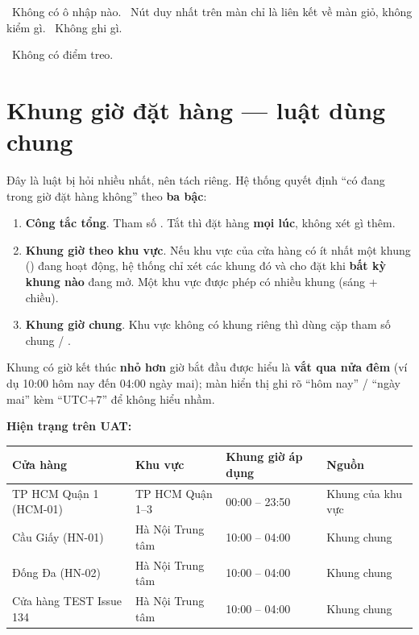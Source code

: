 \mloc\ Không có ô nhập nào. \quad
{}\ Nút duy nhất trên màn chỉ là liên kết về màn giỏ, không kiểm gì.
\quad \mghi\ Không ghi gì.

\mhoi\ Không có điểm treo.

\section{Khung giờ đặt hàng --- luật dùng chung}
\label{sec:khung-gio}

Đây là luật bị hỏi nhiều nhất, nên tách riêng. Hệ thống quyết định ``có đang trong giờ đặt hàng
không'' theo \textbf{ba bậc}:

\begin{enumerate}[leftmargin=*]
  \item \textbf{Công tắc tổng}. Tham số . Tắt thì đặt hàng
        \textbf{mọi lúc}, không xét gì thêm. 
  \item \textbf{Khung giờ theo khu vực}. Nếu khu vực của cửa hàng có ít nhất một khung
        () đang hoạt động, hệ thống chỉ xét các khung đó và cho đặt khi
        \textbf{bất kỳ khung nào} đang mở. Một khu vực được phép có nhiều khung (sáng + chiều).
  \item \textbf{Khung giờ chung}. Khu vực không có khung riêng thì dùng cặp tham số chung
         / . 
\end{enumerate}

Khung có giờ kết thúc \textbf{nhỏ hơn} giờ bắt đầu được hiểu là \textbf{vắt qua nửa đêm} (ví dụ
10:00 hôm nay đến 04:00 ngày mai); màn hiển thị ghi rõ ``hôm nay'' / ``ngày mai'' kèm ``UTC+7''
để không hiểu nhầm.

\textbf{Hiện trạng trên UAT:}

\begin{center}\footnotesize
\begin{tabular}{L{3.9cm}L{3.3cm}L{3.9cm}L{3.5cm}}
\textbf{Cửa hàng} & \textbf{Khu vực} & \textbf{Khung giờ áp dụng} &
  \textbf{Nguồn}\\ \midrule
TP HCM Quận 1 (HCM-01) & TP HCM Quận 1--3 & 00:00 -- 23:50 & Khung của khu vực \\
Cầu Giấy (HN-01) & Hà Nội Trung tâm & 10:00 -- 04:00 & Khung chung \\
Đống Đa (HN-02) & Hà Nội Trung tâm & 10:00 -- 04:00 & Khung chung \\
Cửa hàng TEST Issue 134 & Hà Nội Trung tâm & 10:00 -- 04:00 & Khung chung \\
\end{tabular}
\end{center}

